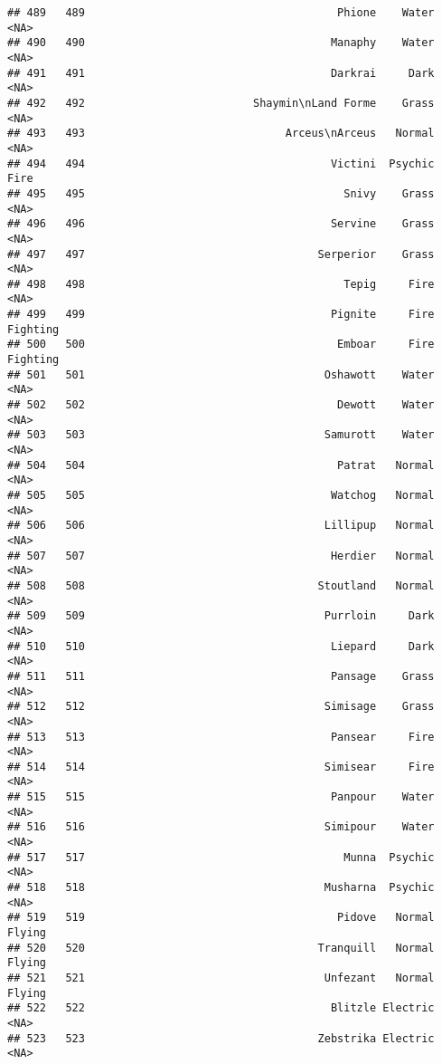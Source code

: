 \documentclass[
]{article}
\begin{document}
\begin{verbatim}
## 489   489                                       Phione    Water     <NA>
## 490   490                                      Manaphy    Water     <NA>
## 491   491                                      Darkrai     Dark     <NA>
## 492   492                          Shaymin\nLand Forme    Grass     <NA>
## 493   493                               Arceus\nArceus   Normal     <NA>
## 494   494                                      Victini  Psychic     Fire
## 495   495                                        Snivy    Grass     <NA>
## 496   496                                      Servine    Grass     <NA>
## 497   497                                    Serperior    Grass     <NA>
## 498   498                                        Tepig     Fire     <NA>
## 499   499                                      Pignite     Fire Fighting
## 500   500                                       Emboar     Fire Fighting
## 501   501                                     Oshawott    Water     <NA>
## 502   502                                       Dewott    Water     <NA>
## 503   503                                     Samurott    Water     <NA>
## 504   504                                       Patrat   Normal     <NA>
## 505   505                                      Watchog   Normal     <NA>
## 506   506                                     Lillipup   Normal     <NA>
## 507   507                                      Herdier   Normal     <NA>
## 508   508                                    Stoutland   Normal     <NA>
## 509   509                                     Purrloin     Dark     <NA>
## 510   510                                      Liepard     Dark     <NA>
## 511   511                                      Pansage    Grass     <NA>
## 512   512                                     Simisage    Grass     <NA>
## 513   513                                      Pansear     Fire     <NA>
## 514   514                                     Simisear     Fire     <NA>
## 515   515                                      Panpour    Water     <NA>
## 516   516                                     Simipour    Water     <NA>
## 517   517                                        Munna  Psychic     <NA>
## 518   518                                     Musharna  Psychic     <NA>
## 519   519                                       Pidove   Normal   Flying
## 520   520                                    Tranquill   Normal   Flying
## 521   521                                     Unfezant   Normal   Flying
## 522   522                                      Blitzle Electric     <NA>
## 523   523                                    Zebstrika Electric     <NA>

\end{verbatim}
\end{document}

